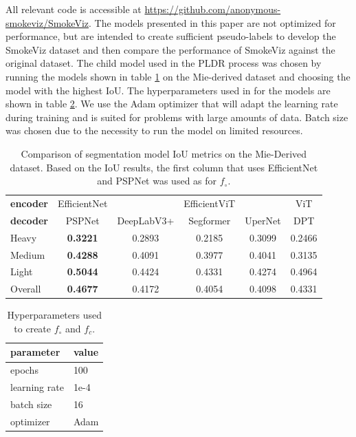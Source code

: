 \documentclass{article}
\begin{document}
All relevant code is accessible at \url{https://github.com/anonymous-smokeviz/SmokeViz}. The models presented in this paper are not optimized for performance, but are intended to create sufficient pseudo-labels to develop the SmokeViz dataset and then compare the performance of SmokeViz against the original dataset. The child model used in the PLDR process was chosen by running the models shown in table \ref{child} on the Mie-derived dataset and choosing the model with the highest IoU. The hyperparameters used in for the models are shown in table \ref{hyper}. We use the Adam optimizer that will adapt the learning rate during training and is suited for problems with large amounts of data. Batch size was chosen due to the necessity to run the model on limited resources. 

\begin{table}[!htb] 
    \caption{Comparison of segmentation model IoU metrics on the Mie-Derived dataset. Based on the IoU results, the first column that uses EfficientNet and PSPNet was used as for \(f_{\circ}\).}\label{child}
    \centering
    \begin{tabular}{lccccc}
        \toprule
        \textbf{encoder} & EfficientNet\cite{efficientnetv2} & \cite{efficientnetv2} & EfficientViT\cite{efficientvit} & \cite{efficientvit}& ViT \cite{vit} \\
        \textbf{decoder} &  PSPNet\cite{pspnet} & DeepLabV3+\cite{deeplab} & Segformer\cite{segformer} & UperNet \cite{upernet}& DPT\cite{dpt} \\
        \midrule
        Heavy   &	\textbf{0.3221}	& 0.2893	&	0.2185	&	0.3099	&	0.2466 \\
        Medium  &	\textbf{0.4288}	& 0.4091	&	0.3977	&   0.4041	&	0.3135 \\
        Light   &	\textbf{0.5044}	& 0.4424	&	0.4331	&	0.4274	&	0.4964 \\
        Overall &	\textbf{0.4677}	& 0.4172	&   0.4054	&	0.4098	&	0.4331 \\
        \bottomrule
    \end{tabular}
\end{table}

\begin{table}
    \caption{Hyperparameters used to create \(f_{\circ}\) and \(f_{c}\).}
  \label{hyper}
  \centering
  \begin{tabular}{ll}
    \toprule
    parameter & value \\ 
    \midrule
    epochs & 100 \\
    learning rate & 1e-4 \\
    batch size & 16 \\
    optimizer & Adam \\
    \bottomrule
  \end{tabular}
\end{table}



\end{document}
